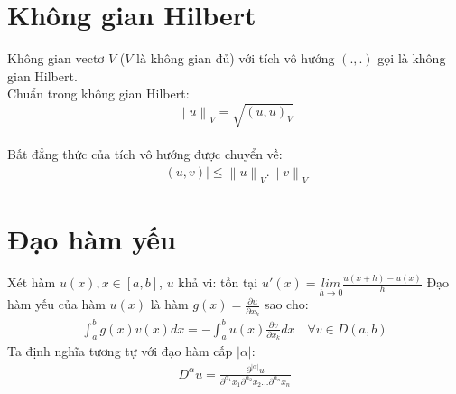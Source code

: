 \documentclass[14pt]{extreport}
\begin{document}
\section{Không gian Hilbert}
Không gian vectơ $V$ ($V$ là không gian đủ) với tích vô hướng $(.,.)$ gọi là không gian Hilbert.\\
Chuẩn trong không gian Hilbert:
$$ \left \| u \right \|_V = \sqrt{(u,u)_V}$$\\
Bất đẳng thức của tích vô hướng được chuyển về:
\begin{align*}
|(u,v)| \leq \left \| u \right \|_V.\left \| v \right \|_V
\end{align*}

\section{Đạo hàm yếu}
Xét hàm $u(x), x \in [a,b]$, $u$ khả vi: tồn tại $u'(x)=\underset{h \rightarrow  0}{lim}\frac{u(x+h)-u(x)}{h}$
Đạo hàm yếu của hàm $u(x)$ là hàm $g(x) = \frac{\partial u}{\partial x_k}$ sao cho:
\begin{align*}
\int_{a}^{b}g(x)v(x)dx = - \int_a^bu(x)\frac{\partial v}{\partial x_k}dx  \quad  \forall v \in D(a,b)
\end{align*}
Ta định nghĩa tương tự với đạo hàm cấp $|\alpha|$:
\begin{align*}
D^{\alpha}u = \frac{\partial^{|\alpha|}u }{\partial^{\alpha_1}x_1\partial^{\alpha_2}x_2 ...\partial^{\alpha_n}x_n  }
\end{align*}
\end{document}
